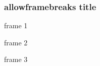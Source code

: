 \documentclass{beamer}
\begin{document}
\begin{frame}[allowframebreaks]
\frametitle{allowframebreaks title}
frame 1
\framebreak

frame 2
\framebreak

frame 3
\framebreak
\end{frame}
\end{document}
